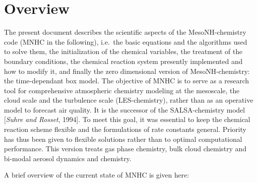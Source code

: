 \section{Overview}
%
The present document describes the scientific aspects of the 
MesoNH-chemistry code (MNHC in the following), i.e.~the basic equations and
the algorithms used to solve them,
the initialization of the chemical variables, 
the treatment of the boundary conditions, 
the chemical reaction system presently implemented and
how to modify it, and finally the zero dimensional version
of MesoNH-chemistry: the time-dependant box model.
%
The objective of MNHC
is to serve as a research tool for comprehensive atmospheric
chemistry modeling at the mesoscale, the cloud scale and the
turbulence scale (LES-chemistry), rather than as an operative
model to forecast air quality.
It is the successor of the SALSA-chemistry model [{\it Suhre and Rosset}, 1994].
To meet this goal, it was essential to keep the chemical reaction
scheme flexible and the formulations of rate constants general.
Priority has thus been given to flexible solutions rather than
to optimal computational performance.
This version treats gas phase chemistry, 
bulk cloud chemistry and bi-modal aerosol dynamics and chemistry.

A brief overview of the current state of MNHC is given here:

